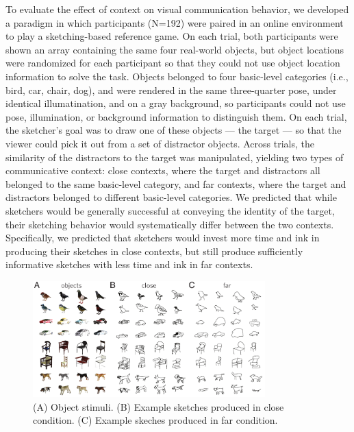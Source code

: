 \documentclass[9pt,twocolumn,twoside]{pnas-new}
\begin{document}
To evaluate the effect of context on visual communication behavior, we developed a paradigm in which participants (N=192) were paired in an online environment to play a sketching-based reference game. On each trial, both participants were shown an array containing the same four real-world objects, but object locations were randomized for each participant so that they could not use object location information to solve the task. Objects belonged to four basic-level categories (i.e., bird, car, chair, dog), and were rendered in the same three-quarter pose, under identical illumatination, and on a gray background, so participants could not use pose, illumination, or background information to distinguish them. 
On each trial, the sketcher's goal was to draw one of these objects --- the target --- so that the viewer could pick it out from a set of distractor objects. 
Across trials, the similarity of the distractors to the target was manipulated, yielding two types of communicative context: close contexts, where the target and distractors all belonged to the same basic-level category, and far contexts, where the target and distractors belonged to different basic-level categories. 
We predicted that while sketchers would be generally successful at conveying the identity of the target, their sketching behavior would systematically differ between the two contexts. 
Specifically, we predicted that sketchers would invest more time and ink in producing their sketches in close contexts, but still produce sufficiently informative sketches with less time and ink in far contexts. 

\begin{figure}[htbp]
\centering
\includegraphics[width=0.8\textwidth]{figures/2_sketch_gallery.pdf}
\caption{(A) Object stimuli. (B) Example sketches produced in close condition. (C) Example skeches produced in far condition.}
\label{sketch_gallery}
\end{figure}
\end{document}
